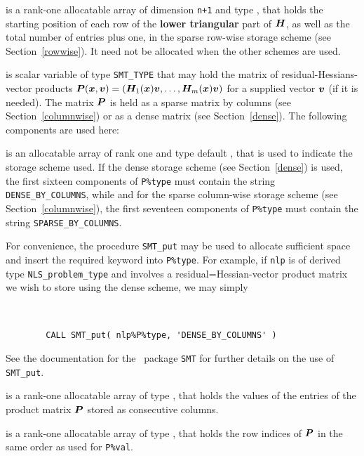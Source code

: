 \documentclass{galahad}
\newcommand{\packagename}{NLS}
\begin{document}
\begin{description}
\begin{description}
 is a rank-one allocatable array of dimension {\tt n+1} and type
\integer, that holds the starting position of
each row of the {\bf lower triangular} part of ${\bm{H}}$, as well
as the total number of entries plus one, in the sparse row-wise storage
scheme (see Section~\ref{rowwise}). It need not be allocated when the
other schemes are used.

\end{description}

 is scalar variable of type {\tt SMT\_TYPE}
that may hold the matrix of residual-Hessians-vector products
${\bm{P}}({\bm{x}},{\bm{v}}) = ({\bm{H}}_1({\bm{x}}) {\bm{v}}, \ldots, {\bm{H}}_m({\bm{x}}) {\bm{v}})$
for a supplied vector ${\bm{v}}$ (if it is needed).
The matrix ${\bm{P}}$ is held as a
sparse matrix by columns (see Section~\ref{columnwise}) or as a
dense matrix (see Section~\ref{dense}).
The following components are used here:

\begin{description}

 is an allocatable array of rank one and type default
\character, that
is used to indicate the storage scheme used. If the dense storage scheme
(see Section~\ref{dense}) is used,
the first sixteen components of {\tt P\%type} must contain the
string {\tt DENSE\_BY\_COLUMNS}, while
and for the sparse column-wise storage scheme (see Section~\ref{columnwise}),
the first seventeen components of {\tt P\%type} must contain the
string {\tt SPARSE\_BY\_COLUMNS}.

For convenience, the procedure {\tt SMT\_put}
may be used to allocate sufficient space and insert the required keyword
into {\tt P\%type}.
For example, if {\tt nlp} is of derived type {\tt \packagename\_problem\_type}
and involves a residual=Hessian-vector product matrix we wish to store
using the dense scheme,
we may simply
{\tt
\begin{verbatim}
        CALL SMT_put( nlp%P%type, 'DENSE_BY_COLUMNS' )
\end{verbatim}
}
\noindent
See the documentation for the \galahad\ package {\tt SMT}
for further details on the use of {\tt SMT\_put}.

 is a rank-one allocatable array of type \realdp,
that holds the values of the entries of the product matrix ${\bm{P}}$ stored
as consecutive columns.

 is a rank-one allocatable array of type \integer,
that holds the row indices of ${\bm{P}}$ in the same order as used for
{\tt P\%val}.


\end{description}
\end{description}
\end{document}
